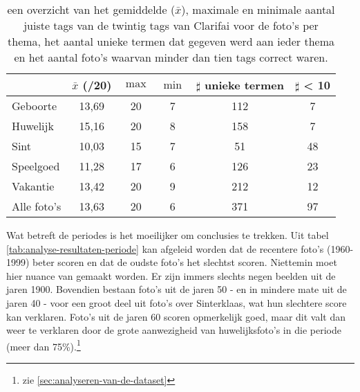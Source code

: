 \begin{table}
	\begin{tabular}{p{3cm}|ccccc}
	 	\toprule
		 & $\bar{x}$ (/20) & $\max$ & $\min$ & $\sharp$ unieke termen & $\sharp$ < 10 \\ 
		\midrule
		Geboorte & 13,69 & 20 & 7 & 112 & 7 \\ 
		Huwelijk & 15,16 & 20 & 8 & 158 & 7 \\ 
		Sint & 10,03 & 15 & 7 & 51 & 48 \\ 
		Speelgoed & 11,28 & 17 & 6 & 126 & 23 \\ 
		Vakantie & 13,42 & 20 & 9 & 212 & 12 \\ 
		Alle foto's & 13,63 & 20 & 6 & 371 & 97 \\ 
	\bottomrule
	\end{tabular} 
	\caption[een overzicht van de resultaten per thema na gebruikt van het ingebouwde model van Clarifai]{een overzicht van het gemiddelde ($\bar{x}$), maximale en minimale aantal juiste tags van de twintig tags van Clarifai voor de foto’s per thema, het aantal unieke termen dat gegeven werd aan ieder thema en het aantal foto’s waarvan minder dan tien tags correct waren. }
	\label{tab:analyse-resultaten-thema}
\end{table}

Wat betreft de periodes is het moeilijker om conclusies te trekken. Uit tabel \ref{tab:analyse-resultaten-periode} kan afgeleid worden dat de recentere foto’s (1960-1999) beter scoren en dat de oudste foto’s het slechtst scoren. Niettemin moet hier nuance van gemaakt worden. Er zijn immers slechts negen beelden uit de jaren 1900. Bovendien bestaan foto’s uit de jaren 50 - en in mindere mate uit de jaren 40 - voor een groot deel uit foto’s over Sinterklaas, wat hun slechtere score kan verklaren. Foto’s uit de jaren 60 scoren opmerkelijk goed, maar dit valt dan weer te verklaren door de grote aanwezigheid van huwelijksfoto’s in die periode (meer dan 75\%).\footnote{zie \ref{sec:analyseren-van-de-dataset}}

